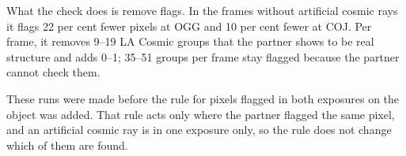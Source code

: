 What the check does is remove flags. In the frames without artificial cosmic rays it flags 22 per cent fewer pixels at
OGG and 10 per cent fewer at COJ. Per frame, it removes 9--19 LA Cosmic groups that the partner shows to be real
structure and adds 0--1; 35--51 groups per frame stay flagged because the partner cannot check them.

These runs were made before the rule for pixels flagged in both exposures on the object was added. That rule acts only
where the partner flagged the same pixel, and an artificial cosmic ray is in one exposure only, so the rule does not
change which of them are found.


